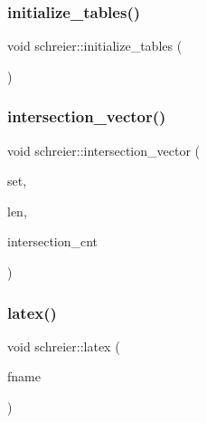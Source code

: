 \mbox{\label{classschreier_acccc16670f88b14ddc69856cd5c0b36d}} 
\subsubsection{\texorpdfstring{initialize\+\_\+tables()}{initialize\_tables()}}
{\footnotesize\ttfamily void schreier\+::initialize\+\_\+tables (\begin{DoxyParamCaption}{ }\end{DoxyParamCaption})}

\mbox{\label{classschreier_ad3eb33470da4e9e011f2ddf2c46f06a8}} 
\subsubsection{\texorpdfstring{intersection\+\_\+vector()}{intersection\_vector()}}
{\footnotesize\ttfamily void schreier\+::intersection\+\_\+vector (\begin{DoxyParamCaption}\item[{\mbox{\hyperlink{galois_8h_a09fddde158a3a20bd2dcadb609de11dc}{I\+NT}} $\ast$}]{set,  }\item[{\mbox{\hyperlink{galois_8h_a09fddde158a3a20bd2dcadb609de11dc}{I\+NT}}}]{len,  }\item[{\mbox{\hyperlink{galois_8h_a09fddde158a3a20bd2dcadb609de11dc}{I\+NT}} $\ast$}]{intersection\+\_\+cnt }\end{DoxyParamCaption})}

\mbox{\label{classschreier_aff94ed06d8ca33cb26accd435d525ea2}} 
\subsubsection{\texorpdfstring{latex()}{latex()}}
{\footnotesize\ttfamily void schreier\+::latex (\begin{DoxyParamCaption}\item[{const \mbox{\hyperlink{galois_8h_ab6cc7b4aeb6ea31aba2b3fbfc83ff5e6}{B\+Y\+TE}} $\ast$}]{fname }\end{DoxyParamCaption})}


